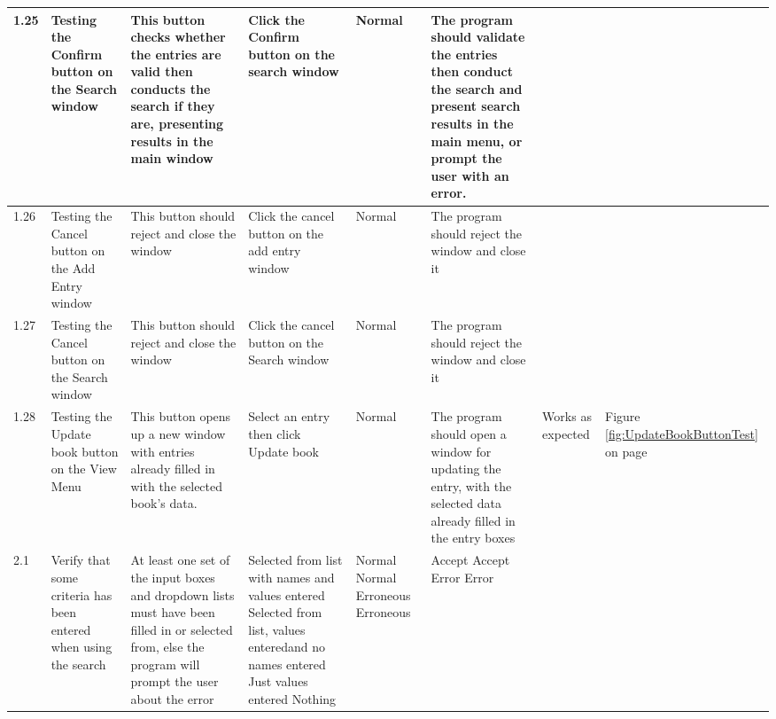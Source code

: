 \begin{landscape}
\begin{center}
\begin{longtable}{|p{1.5cm}|p{2cm}|p{2.5cm}|p{2.5cm}|p{2cm}|p{2cm}|p{2cm}|p{2cm}|}
\rowcolor{lightgray} 1.25 & Testing the Confirm button on the Search window & This button checks whether the entries are valid then conducts the search if they are, presenting results in the main window & Click the Confirm button on the search window & Normal & The program should validate the entries then conduct the search and present search results in the main menu, or prompt the user with an error. & & \\ \hline
\rowcolor{lightgray} 1.26 & Testing the Cancel button on the Add Entry window & This button should reject and close the window & Click the cancel button on the add entry window & Normal & The program should reject the window and close it & & \\ \hline
\rowcolor{lightgray} 1.27 & Testing the Cancel button on the Search window & This button should reject and close the window & Click the cancel button on the Search window & Normal & The program should reject the window and close it & & \\ \hline
\rowcolor{lightgray} 1.28 & Testing the Update book button on the View Menu & This button opens up a new window with entries already filled in with the selected book's data. & Select an entry then click Update book & Normal & The program should open a window for updating the entry, with the selected data already filled in the entry boxes & Works as expected & Figure \ref{fig:UpdateBookButtonTest} on page \pageref{fig:UpdateBookButtonTest} \\ \hline
        2.1 & Verify that some criteria has been entered when using the search & At least one set of the input boxes and dropdown lists must have been filled in or selected from, else the program will prompt the user about the error & Selected from list with names and values entered \newline Selected from list, values enteredand no names entered \newline Just values entered \newline Nothing   & Normal \newline Normal \newline Erroneous \newline Erroneous & Accept \newline Accept \newline Error \newline Error & & \\ \hline

\end{longtable}
\end{center}
\end{landscape}
